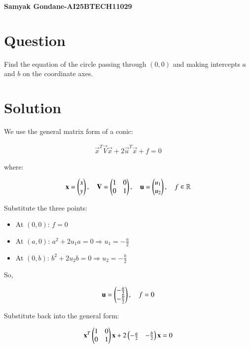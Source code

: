 \documentclass{article}
\begin{document}
\begin{center}
\large
    \textbf{Samyak Gondane-AI25BTECH11029}
\end{center}
\date{}

\section*{Question}
Find the equation of the circle passing through $(0, 0)$ and making intercepts $a$ and $b$ on the coordinate axes.


\section*{Solution}

We use the general matrix form of a conic:


\begin{align}
\vec{x}^T \vec{V} \vec{x} + 2\vec{u}^T \vec{x} + f = 0
\end{align}


where:


\begin{align}
\mathbf{x} = \begin{pmatrix}x \\ y\end{pmatrix}, \quad
\mathbf{V} = \begin{pmatrix}1 & 0 \\ 0 & 1\end{pmatrix}, \quad
\mathbf{u} = \begin{pmatrix}u_1 \\ u_2\end{pmatrix}, \quad
f \in \mathbb{R}
\end{align}



Substitute the three points:

\begin{itemize}
  \item At $(0, 0)$: $f = 0$
  \item At $(a, 0)$: $a^2 + 2u_1 a = 0 \Rightarrow u_1 = -\frac{a}{2}$
  \item At $(0, b)$: $b^2 + 2u_2 b = 0 \Rightarrow u_2 = -\frac{b}{2}$
\end{itemize}

So,


\begin{align}
\mathbf{u} = \begin{pmatrix}-\frac{a}{2} \\ -\frac{b}{2}\end{pmatrix}, \quad f = 0
\end{align}



Substitute back into the general form:


\begin{align}
\mathbf{x}^T \begin{pmatrix}1 & 0 \\ 0 & 1\end{pmatrix} \mathbf{x}
+ 2 \begin{pmatrix}-\frac{a}{2} & -\frac{b}{2}\end{pmatrix} \mathbf{x}
= 0
\end{align}
\end{document}
